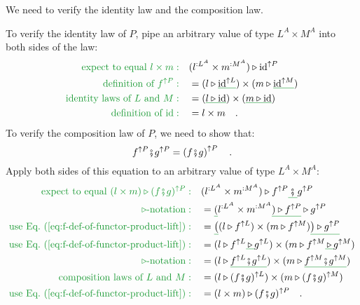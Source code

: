 We need to verify the identity law and the composition law.

To verify the identity law of $P$, pipe an arbitrary value of type
$L^{A}\times M^{A}$ into both sides of the law:
\begin{align*}
{\color{greenunder}\text{expect to equal }l\times m:}\quad & (l^{:L^{A}}\times m^{:M^{A}})\triangleright\text{id}^{\uparrow P}\\
{\color{greenunder}\text{definition of }f^{\uparrow P}:}\quad & =(l\triangleright\gunderline{\text{id}^{\uparrow L}})\times(m\triangleright\gunderline{\text{id}^{\uparrow M}})\\
{\color{greenunder}\text{identity laws of }L\text{ and }M:}\quad & =(\gunderline{l\triangleright\text{id}})\times(\gunderline{m\triangleright\text{id}})\\
{\color{greenunder}\text{definition of }\text{id}:}\quad & =l\times m\quad.
\end{align*}
To verify the composition law of $P$, we need to show that:
\[
f^{\uparrow P}\bef g^{\uparrow P}=\left(f\bef g\right)^{\uparrow P}\quad.
\]
Apply both sides of this equation to an arbitrary value of type $L^{A}\times M^{A}$:
\begin{align*}
{\color{greenunder}\text{expect to equal }(l\times m)\triangleright(f\bef g)^{\uparrow P}:}\quad & (l^{:L^{A}}\times m^{:M^{A}})\triangleright f^{\uparrow P}\gunderline{\,\bef\,}g^{\uparrow P}\\
{\color{greenunder}\triangleright\text{-notation}:}\quad & =\gunderline (l^{:L^{A}}\times m^{:M^{A}}\gunderline{)\triangleright f^{\uparrow P}}\triangleright g^{\uparrow P}\\
{\color{greenunder}\text{use Eq.~(\ref{eq:f-def-of-functor-product-lift})}:}\quad & =\gunderline{\big(}(l\triangleright f^{\uparrow L})\times(m\triangleright f^{\uparrow M})\gunderline{\big)\triangleright g^{\uparrow P}}\\
{\color{greenunder}\text{use Eq.~(\ref{eq:f-def-of-functor-product-lift})}:}\quad & =(l\triangleright f^{\uparrow L}\gunderline{\,\triangleright\,}g^{\uparrow L})\times(m\triangleright f^{\uparrow M}\gunderline{\,\triangleright\,}g^{\uparrow M})\\
{\color{greenunder}\triangleright\text{-notation}:}\quad & =(l\triangleright\gunderline{f^{\uparrow L}\bef g^{\uparrow L}})\times(m\triangleright\gunderline{f^{\uparrow M}\bef g^{\uparrow M}})\\
{\color{greenunder}\text{composition laws of }L\text{ and }M:}\quad & =(l\triangleright(f\bef g)^{\uparrow L})\times(m\triangleright(f\bef g)^{\uparrow M})\\
{\color{greenunder}\text{use Eq.~(\ref{eq:f-def-of-functor-product-lift})}:}\quad & =(l\times m)\triangleright(f\bef g)^{\uparrow P}\quad.
\end{align*}
